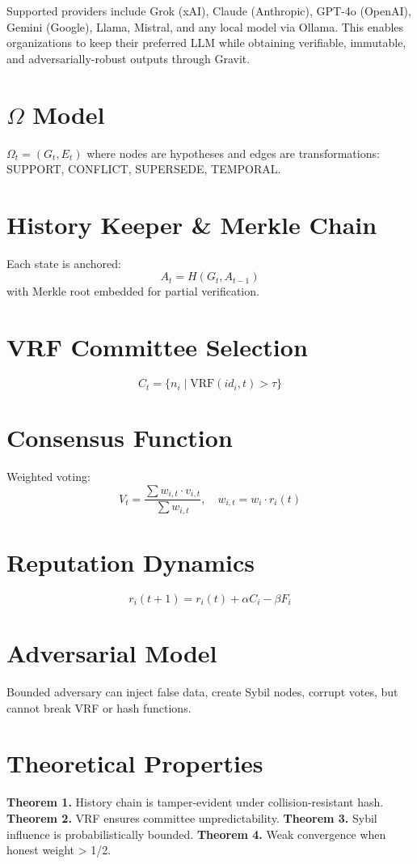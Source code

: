 \documentclass[11pt,a4paper]{article}
\begin{document}
Supported providers include Grok (xAI), Claude (Anthropic), GPT-4o (OpenAI), Gemini (Google), Llama, Mistral, and any local model via Ollama. This enables organizations to keep their preferred LLM while obtaining verifiable, immutable, and adversarially-robust outputs through Gravit.

\section{$\Omega$ Model}
$\Omega_t = (G_t, E_t)$ where nodes are hypotheses and edges are transformations: SUPPORT, CONFLICT, SUPERSEDE, TEMPORAL.

\section{History Keeper \& Merkle Chain}
Each state is anchored:
\[ A_t = H(G_t, A_{t-1}) \]
with Merkle root embedded for partial verification.

\section{VRF Committee Selection}
\[ C_t = \{ n_i \mid \text{VRF}(id_i, t) > \tau \} \]

\section{Consensus Function}
Weighted voting:
\[ V_t = \frac{\sum w_{i,t} \cdot v_{i,t}}{\sum w_{i,t}}, \quad w_{i,t} = w_i \cdot r_i(t) \]

\section{Reputation Dynamics}
\[ r_i(t+1) = r_i(t) + \alpha C_i - \beta F_i \]

\section{Adversarial Model}
Bounded adversary can inject false data, create Sybil nodes, corrupt votes, but cannot break VRF or hash functions.

\section{Theoretical Properties}
\textbf{Theorem 1.} History chain is tamper-evident under collision-resistant hash.
\textbf{Theorem 2.} VRF ensures committee unpredictability.
\textbf{Theorem 3.} Sybil influence is probabilistically bounded.
\textbf{Theorem 4.} Weak convergence when honest weight > 1/2.
\end{document}
